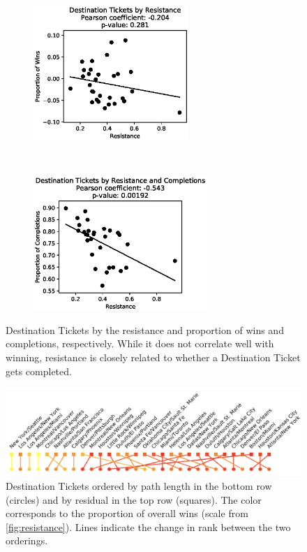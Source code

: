 \begin{figure}[H]
    \centering
    \begin{subfigure}[t]{0.5\textwidth}
        \centering
        \includegraphics[height=2in]{figures/correlation1}
    \end{subfigure}%
    ~ 
    \begin{subfigure}[t]{0.5\textwidth}
        \centering
        \includegraphics[height=2in]{figures/completion}
    \end{subfigure}%
    \caption{Destination Tickets by the resistance and
    proportion of wins and completions, respectively.
    While it does not correlate well with
    winning, resistance is closely related to
    whether a Destination Ticket gets completed.
    }
    \label{fig:completion}
\end{figure}

\begin{figure}[H]
    \centering
    \includegraphics[scale=.25]{figures/rankings2.png}
    \caption{Destination Tickets ordered by path length
    in the bottom row (circles) and by residual
    in the top row (squares). The color
    corresponds to the proportion of overall wins (scale
    from \cref{fig:resistance}).
    Lines indicate the change in rank between
    the two orderings.}
    \label{fig:rankings}
\end{figure}

